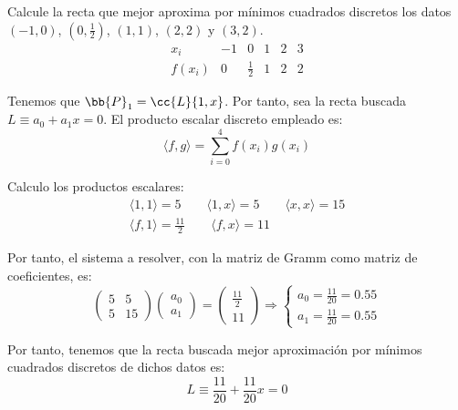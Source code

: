 \label{sec:Rel4}

\begin{ejercicio} Calcule la recta que mejor aproxima por mínimos cuadrados discretos los datos $(-1,0)$, $\left(0, \frac{1}{2}\right)$, $(1,1)$, $(2,2)$ y $(3,2)$.
    \begin{equation*}
        \begin{array}{c|ccccc}
            x_i & -1 & 0 & 1 & 2 & 3 \\ \hline
            f(x_i) & 0 & \frac{1}{2} & 1 & 2 & 2
        \end{array}
    \end{equation*}
    
    Tenemos que $\bb{P}_1=\cc{L}\{1,x\}$. Por tanto, sea la recta buscada $L\equiv a_0+a_1x=0$. El producto escalar discreto empleado es:
    \begin{equation*}
        \langle f,g\rangle = \sum_{i=0}^4 f(x_i)g(x_i)
    \end{equation*}

    Calculo los productos escalares:
    \begin{gather*}
        \langle 1,1 \rangle = 5
        \qquad
        \langle 1,x \rangle = 5
        \qquad
        \langle x,x \rangle = 15
        \\
        \langle f,1\rangle = \frac{11}{2}
        \qquad
        \langle f,x \rangle = 11
    \end{gather*}

    Por tanto, el sistema a resolver, con la matriz de Gramm como matriz de coeficientes, es:
    \begin{equation*}
        \left(\begin{array}{cc}
            5 & 5 \\
            5 & 15
        \end{array}\right)
        \left(\begin{array}{c}
            a_0 \\ a_1    
        \end{array}\right)
        = 
        \left(\begin{array}{c}
            \frac{11}{2} \\ 11    
        \end{array}\right)
        \Longrightarrow
        \left\{\begin{array}{c}
            a_0 = \frac{11}{20} = 0.55  \\
            a_1 = \frac{11}{20} = 0.55
        \end{array}\right.
    \end{equation*}

    Por tanto, tenemos que la recta buscada mejor aproximación por mínimos cuadrados discretos de dichos datos es:
    \begin{equation*}
        L\equiv \frac{11}{20} + \frac{11}{20}x=0
    \end{equation*}

\end{ejercicio}


